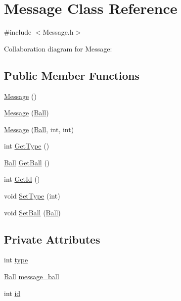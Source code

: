 \hypertarget{classMessage}{\section{Message Class Reference}
\label{classMessage}
}


{\ttfamily \#include $<$Message.\+h$>$}



Collaboration diagram for Message\+:
\subsection*{Public Member Functions}
\begin{DoxyCompactItemize}
\item 
\hyperlink{classMessage_a4fc4f717b634e66070366cb7722d7761}{Message} ()
\item 
\hyperlink{classMessage_a985b1d9ea33c80659f7977e05ea113b5}{Message} (\hyperlink{classBall}{Ball})
\item 
\hyperlink{classMessage_aeba6acc9fff500ea53c4fa4c660115ca}{Message} (\hyperlink{classBall}{Ball}, int, int)
\item 
int \hyperlink{classMessage_a004cab173284bbe1e56184294937639d}{Get\+Type} ()
\item 
\hyperlink{classBall}{Ball} \hyperlink{classMessage_ae5df8cd85bc3297f24f47e437381a528}{Get\+Ball} ()
\item 
int \hyperlink{classMessage_a131246be6ce1419fe230f2495553d2ca}{Get\+Id} ()
\item 
void \hyperlink{classMessage_a7bc979668959a5c6cf1985937868573d}{Set\+Type} (int)
\item 
void \hyperlink{classMessage_a6c7768c8aa4bf5876277874e483e56ce}{Set\+Ball} (\hyperlink{classBall}{Ball})
\end{DoxyCompactItemize}
\subsection*{Private Attributes}
\begin{DoxyCompactItemize}
\item 
int \hyperlink{classMessage_afbfb481c98b13d0deba0bac443bebe29}{type}
\item 
\hyperlink{classBall}{Ball} \hyperlink{classMessage_a391ccb84ba4fe69bf4f172952545f2bb}{message\+\_\+ball}
\item 
int \hyperlink{classMessage_ab1d21c0ed16844f0d643acf6e85cdae3}{id}
\end{DoxyCompactItemize}


